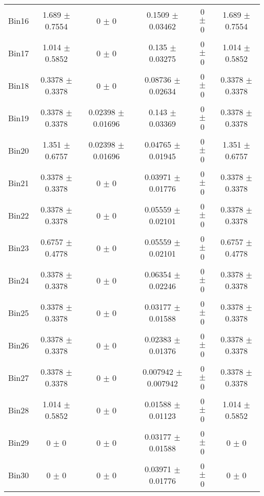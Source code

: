 \begin{tabular}{@{\extracolsep{4pt}}lccccc@{}}
     Bin16 & 1.689 $\pm$ 0.7554 & 0 $\pm$ 0 & 0.1509 $\pm$ 0.03462 & 0 $\pm$ 0 & 1.689 $\pm$ 0.7554 \\ 
     Bin17 & 1.014 $\pm$ 0.5852 & 0 $\pm$ 0 & 0.135 $\pm$ 0.03275 & 0 $\pm$ 0 & 1.014 $\pm$ 0.5852 \\ 
     Bin18 & 0.3378 $\pm$ 0.3378 & 0 $\pm$ 0 & 0.08736 $\pm$ 0.02634 & 0 $\pm$ 0 & 0.3378 $\pm$ 0.3378 \\ 
     Bin19 & 0.3378 $\pm$ 0.3378 & 0.02398 $\pm$ 0.01696 & 0.143 $\pm$ 0.03369 & 0 $\pm$ 0 & 0.3378 $\pm$ 0.3378 \\ 
     Bin20 & 1.351 $\pm$ 0.6757 & 0.02398 $\pm$ 0.01696 & 0.04765 $\pm$ 0.01945 & 0 $\pm$ 0 & 1.351 $\pm$ 0.6757 \\ 
     Bin21 & 0.3378 $\pm$ 0.3378 & 0 $\pm$ 0 & 0.03971 $\pm$ 0.01776 & 0 $\pm$ 0 & 0.3378 $\pm$ 0.3378 \\ 
     Bin22 & 0.3378 $\pm$ 0.3378 & 0 $\pm$ 0 & 0.05559 $\pm$ 0.02101 & 0 $\pm$ 0 & 0.3378 $\pm$ 0.3378 \\ 
     Bin23 & 0.6757 $\pm$ 0.4778 & 0 $\pm$ 0 & 0.05559 $\pm$ 0.02101 & 0 $\pm$ 0 & 0.6757 $\pm$ 0.4778 \\ 
     Bin24 & 0.3378 $\pm$ 0.3378 & 0 $\pm$ 0 & 0.06354 $\pm$ 0.02246 & 0 $\pm$ 0 & 0.3378 $\pm$ 0.3378 \\ 
     Bin25 & 0.3378 $\pm$ 0.3378 & 0 $\pm$ 0 & 0.03177 $\pm$ 0.01588 & 0 $\pm$ 0 & 0.3378 $\pm$ 0.3378 \\ 
     Bin26 & 0.3378 $\pm$ 0.3378 & 0 $\pm$ 0 & 0.02383 $\pm$ 0.01376 & 0 $\pm$ 0 & 0.3378 $\pm$ 0.3378 \\ 
     Bin27 & 0.3378 $\pm$ 0.3378 & 0 $\pm$ 0 & 0.007942 $\pm$ 0.007942 & 0 $\pm$ 0 & 0.3378 $\pm$ 0.3378 \\ 
     Bin28 & 1.014 $\pm$ 0.5852 & 0 $\pm$ 0 & 0.01588 $\pm$ 0.01123 & 0 $\pm$ 0 & 1.014 $\pm$ 0.5852 \\ 
     Bin29 & 0 $\pm$ 0 & 0 $\pm$ 0 & 0.03177 $\pm$ 0.01588 & 0 $\pm$ 0 & 0 $\pm$ 0 \\ 
     Bin30 & 0 $\pm$ 0 & 0 $\pm$ 0 & 0.03971 $\pm$ 0.01776 & 0 $\pm$ 0 & 0 $\pm$ 0 \\ 
\hline\hline
  \end{tabular}
